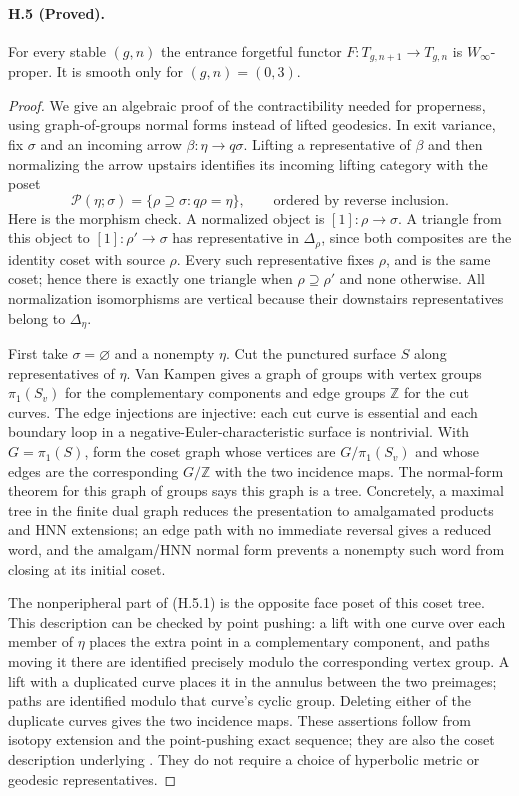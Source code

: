 \paragraph{H.5 (Proved).}
For every stable $(g,n)$ the entrance forgetful functor
$F:T_{g,n+1}\to T_{g,n}$ is $W_\infty$-proper. It is smooth
only for $(g,n)=(0,3)$.
\begin{proof}
We give an algebraic proof of the contractibility needed for
properness, using graph-of-groups normal forms instead of lifted
geodesics. In exit variance, fix $\sigma$ and an incoming arrow
$\beta:\eta\to q\sigma$. Lifting a representative of $\beta$
and then normalizing the arrow upstairs identifies its incoming
lifting category with the poset
\[
 \mathcal P(\eta;\sigma)
   =\{\rho\supseteq\sigma:q\rho=\eta\},
 \qquad\text{ordered by reverse inclusion}.
 \tag{H.5.1}
\]
Here is the morphism check. A normalized object is
$[1]:\rho\to\sigma$. A triangle from this object to
$[1]:\rho'\to\sigma$ has representative in $\Delta_\rho$,
since both composites are the identity coset with source
$\rho$. Every such representative fixes $\rho$, and is the
same coset; hence there is exactly one triangle when
$\rho\supseteq\rho'$ and none otherwise. All normalization
isomorphisms are vertical because their downstairs representatives
belong to $\Delta_\eta$.

First take $\sigma=\varnothing$ and a nonempty $\eta$. Cut the
punctured surface $S$ along representatives of $\eta$. Van Kampen
gives a graph of groups with vertex groups $\pi_1(S_v)$ for the
complementary components and edge groups $\mathbb Z$ for the
cut curves. The edge injections are injective: each cut curve
is essential and each boundary loop in a negative-Euler-characteristic
surface is nontrivial. With $G=\pi_1(S)$, form the coset graph
whose vertices are $G/\pi_1(S_v)$ and whose edges are the
corresponding $G/\mathbb Z$ with the two incidence maps. The
normal-form theorem for this graph of groups says this graph is
a tree. Concretely, a maximal tree in the finite dual graph
reduces the presentation to amalgamated products and HNN
extensions; an edge path with no immediate reversal gives a
reduced word, and the amalgam/HNN normal form prevents a
nonempty such word from closing at its initial coset.

The nonperipheral part of (H.5.1) is the opposite face poset of
this coset tree. This description can be checked by point pushing:
a lift with one curve over each member of $\eta$ places the
extra point in a complementary component, and paths moving it
there are identified precisely modulo the corresponding vertex
group. A lift with a duplicated curve places it in the annulus
between the two preimages; paths are identified modulo that
curve's cyclic group. Deleting either of the duplicate curves
gives the two incidence maps. These assertions follow from
isotopy extension and the point-pushing exact sequence; they
are also the coset description underlying \citet[Section 7]{GHIJKentLeiningerSchleimer2009}. They do not require a choice of
hyperbolic metric or geodesic representatives.


\end{proof}
